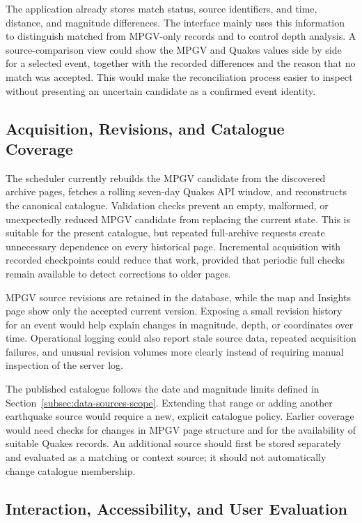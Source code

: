 \documentclass[12pt]{article}
\begin{document}
The application already stores match status, source identifiers, and time, distance, and magnitude differences. The interface mainly uses this information to distinguish matched from MPGV-only records and to control depth analysis. A source-comparison view could show the MPGV and Quakes values side by side for a selected event, together with the recorded differences and the reason that no match was accepted. This would make the reconciliation process easier to inspect without presenting an uncertain candidate as a confirmed event identity.

\subsection{Acquisition, Revisions, and Catalogue Coverage}

The scheduler currently rebuilds the MPGV candidate from the discovered archive pages, fetches a rolling seven-day Quakes API window, and reconstructs the canonical catalogue. Validation checks prevent an empty, malformed, or unexpectedly reduced MPGV candidate from replacing the current state. This is suitable for the present catalogue, but repeated full-archive requests create unnecessary dependence on every historical page. Incremental acquisition with recorded checkpoints could reduce that work, provided that periodic full checks remain available to detect corrections to older pages.

MPGV source revisions are retained in the database, while the map and Insights page show only the accepted current version. Exposing a small revision history for an event would help explain changes in magnitude, depth, or coordinates over time. Operational logging could also report stale source data, repeated acquisition failures, and unusual revision volumes more clearly instead of requiring manual inspection of the server log.

The published catalogue follows the date and magnitude limits defined in Section~\ref{subsec:data-sources-scope}. Extending that range or adding another earthquake source would require a new, explicit catalogue policy. Earlier coverage would need checks for changes in MPGV page structure and for the availability of suitable Quakes records. An additional source should first be stored separately and evaluated as a matching or context source; it should not automatically change catalogue membership.

\subsection{Interaction, Accessibility, and User Evaluation}
\end{document}
